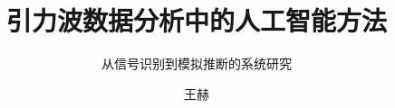 \documentclass[zihao=-4,fontset=none,twoside,openright]{ctexbook}
\title{引力波数据分析中的人工智能方法}
\subtitle{从信号识别到模拟推断的系统研究}
\author{王赫}
\makeatletter
\newcommand*\footimage[1]{\def\@footimage{#1}}
\newcommand*\foottext[1]{\def\@foottext{#1}}
\newcommand*\foottheme[1]{\def\@foottheme{#1}}
\makeatother
\begin{document}
\pagestyle{mainpagestyle}

\makecover

{
  \setcounter{tocdepth}{1}
  \tableofcontents
  \thispagestyle{empty}
}
\cleardoublepage
\setcounter{page}{1}

\foottheme{}
\footimage{figures/faraday.jpg}
\foottext{引力波的存在是广义相对论最重要的预言之一，其探测开辟了观测宇宙的全新窗口。\hfill —— 爱因斯坦（1916）}





\foottheme{}
\footimage{figures/newton.jpg}
\foottext{引力波是时空的涟漪，以光速传播，携带着宇宙中最剧烈事件的信息。\hfill —— 基普·索恩（2017年诺贝尔物理学奖）}


\foottheme{}
\footimage{figures/faraday.jpg}
\foottext{在高斯平稳噪声中，匹配滤波是最优的线性检测器——这是奈曼-皮尔逊引理的直接推论。\hfill —— 引力波数据分析经典结论}


\foottheme{}
\footimage{figures/newton.jpg}
\foottext{神经网络不是替代物理先验，而是在物理约束的引导下，探索人类专家难以直接触及的算法空间。\hfill —— 本书方法论核心}


\foottheme{}
\footimage{figures/faraday.jpg}
\foottext{物理驱动与数据驱动的融合，不是两种方法的简单叠加，而是在更高层次上的方法论统一。\hfill —— 本书第四部}

\end{document}
